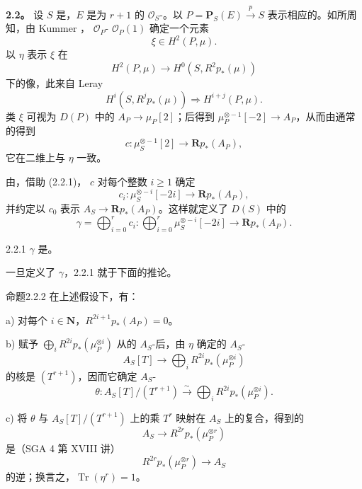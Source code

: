 \textbf{2.2。} 设 $S$ 是，$E$ 是为 $r+1$ 的 $\mathscr O_S$-。以 $P=\mathbf P_S(E)\xrightarrow{p}S$ 表示相应的。如所周知，由 Kummer ， $\mathscr O_P$- $\mathscr O_P(1)$ 确定一个元素
\[
 \xi\in H^2(P,\mu).
\]
以 $\eta$ 表示 $\xi$ 在
\[
 H^2(P,\mu)\longrightarrow H^0(S,R^2p_*(\mu))
\]
下的像，此来自 Leray 
\[
 H^i(S,R^jp_*(\mu))\Longrightarrow H^{i+j}(P,\mu).
\]
类 $\xi$ 可视为 $D(P)$ 中的 $A_P\to\mu_P[2]$；后得到 $\mu_P^{\otimes-1}[-2]\to A_P$，从而由通常的得到
\[
 c:\mu_S^{\otimes-1}[2]\longrightarrow\mathbf Rp_*(A_P),
\]
它在二维上与 $\eta$ 一致。

由，借助 (2.2.1)， $c$ 对每个整数 $i\ge1$ 确定
\[
 c_i:\mu_S^{\otimes-i}[-2i]\longrightarrow\mathbf Rp_*(A_P),
\]
并约定以 $c_0$ 表示 $A_S\to\mathbf Rp_*(A_P)$。这样就定义了 $D(S)$ 中的
\[
 \gamma=\bigoplus_{i=0}^r c_i:
 \bigoplus_{i=0}^r\mu_S^{\otimes-i}[-2i]\longrightarrow\mathbf Rp_*(A_P).
\]

\begin{SGAresult}{}{2.2.1}
 $\gamma$ 是。
\end{SGAresult}
一旦定义了 $\gamma$，2.2.1 就于下面的推论。

\begin{SGAresult}{命题}{2.2.2}
在上述假设下，有：

a) 对每个 $i\in\mathbf N$，$R^{2i+1}p_*(A_P)=0$。

b) 赋予 $\bigoplus_iR^{2i}p_*(\mu_P^{\otimes i})$ 从的 $A_S$-后，由 $\eta$ 确定的 $A_S$-
\[
 A_S[T]\longrightarrow\bigoplus_iR^{2i}p_*(\mu_P^{\otimes i})
\]
的核是 $(T^{r+1})$，因而它确定 $A_S$-
\[
 \theta:A_S[T]/(T^{r+1})\xrightarrow{\sim}\bigoplus_iR^{2i}p_*(\mu_P^{\otimes i}).
\]

c) 将 $\theta$ 与 $A_S[T]/(T^{r+1})$ 上的乘 $T^r$ 映射在 $A_S$ 上的复合，得到的
\[
 A_S\longrightarrow R^{2r}p_*(\mu_P^{\otimes r})
\]
是（SGA 4 第 XVIII 讲）
\[
 R^{2r}p_*(\mu_P^{\otimes r})\longrightarrow A_S
\]
的逆；换言之，$\operatorname{Tr}(\eta^r)=1$。
\end{SGAresult}


